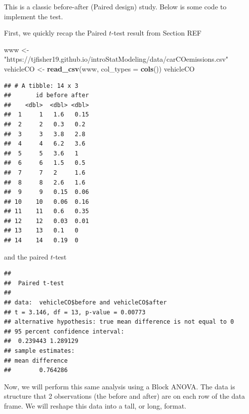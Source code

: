 \documentclass[
]{book}
\newenvironment{Shaded}{\begin{snugshade}}{\end{snugshade}}
\newcommand{\AttributeTok}[1]{\textcolor[rgb]{0.13,0.29,0.53}{#1}}
\newcommand{\ConstantTok}[1]{\textcolor[rgb]{0.56,0.35,0.01}{#1}}
\newcommand{\FunctionTok}[1]{\textcolor[rgb]{0.13,0.29,0.53}{\textbf{#1}}}
\newcommand{\NormalTok}[1]{#1}
\newcommand{\OtherTok}[1]{\textcolor[rgb]{0.56,0.35,0.01}{#1}}
\newcommand{\SpecialCharTok}[1]{\textcolor[rgb]{0.81,0.36,0.00}{\textbf{#1}}}
\newcommand{\StringTok}[1]{\textcolor[rgb]{0.31,0.60,0.02}{#1}}
\begin{document}
This is a classic before-after (Paired design) study. Below is some code to implement the test.

First, we quickly recap the Paired \(t\)-test result from Section REF

\begin{Shaded}
\begin{Highlighting}[]
\NormalTok{www }\OtherTok{\textless{}{-}} \StringTok{"https://tjfisher19.github.io/introStatModeling/data/carCOemissions.csv"}
\NormalTok{vehicleCO }\OtherTok{\textless{}{-}} \FunctionTok{read\_csv}\NormalTok{(www, }\AttributeTok{col\_types =} \FunctionTok{cols}\NormalTok{())}
\NormalTok{vehicleCO}
\end{Highlighting}
\end{Shaded}

\begin{verbatim}
## # A tibble: 14 x 3
##       id before after
##    <dbl>  <dbl> <dbl>
##  1     1   1.6   0.15
##  2     2   0.3   0.2 
##  3     3   3.8   2.8 
##  4     4   6.2   3.6 
##  5     5   3.6   1   
##  6     6   1.5   0.5 
##  7     7   2     1.6 
##  8     8   2.6   1.6 
##  9     9   0.15  0.06
## 10    10   0.06  0.16
## 11    11   0.6   0.35
## 12    12   0.03  0.01
## 13    13   0.1   0   
## 14    14   0.19  0
\end{verbatim}

and the paired \(t\)-test

\begin{Shaded}
\end{Shaded}

\begin{verbatim}
## 
##  Paired t-test
## 
## data:  vehicleCO$before and vehicleCO$after
## t = 3.146, df = 13, p-value = 0.00773
## alternative hypothesis: true mean difference is not equal to 0
## 95 percent confidence interval:
##  0.239443 1.289129
## sample estimates:
## mean difference 
##        0.764286
\end{verbatim}

Now, we will perform this same analysis using a Block ANOVA.
The data is structure that 2 observations (the before and after) are on each row of the data frame.
We will reshape this data into a tall, or long, format.
\end{document}
